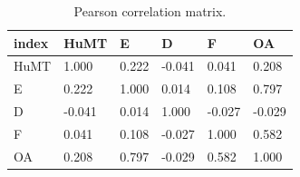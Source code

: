 \begin{table}[t]
\centering
\caption{Pearson correlation matrix.}
\label{tab:corr_pearson}
\begin{tabular}{llllll}
\toprule
index & HuMT & E & D & F & OA \\
\midrule
HuMT & 1.000 & 0.222 & -0.041 & 0.041 & 0.208 \\
E & 0.222 & 1.000 & 0.014 & 0.108 & 0.797 \\
D & -0.041 & 0.014 & 1.000 & -0.027 & -0.029 \\
F & 0.041 & 0.108 & -0.027 & 1.000 & 0.582 \\
OA & 0.208 & 0.797 & -0.029 & 0.582 & 1.000 \\
\bottomrule
\end{tabular}
\end{table}
